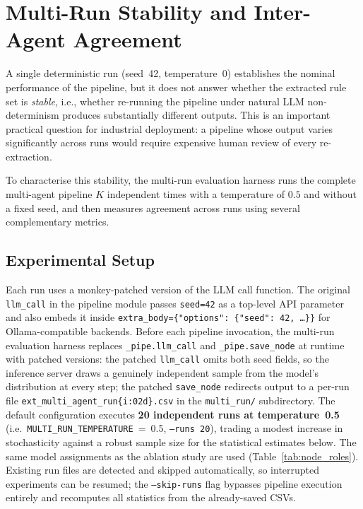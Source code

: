 ﻿\documentclass[11pt]{article}
\begin{document}
\section{Multi-Run Stability and Inter-Agent Agreement}
\label{sec:multirun}

A single deterministic run (seed~42, temperature~0) establishes the nominal
performance of the pipeline, but it does not answer whether the extracted rule
set is \emph{stable}, i.e., whether re-running the pipeline under natural
LLM non-determinism produces substantially different outputs.
This is an important practical question for industrial deployment: a pipeline
whose output varies significantly across runs would require expensive human
review of every re-extraction.

To characterise this stability, the multi-run evaluation harness runs the complete multi-agent pipeline $K$
independent times with a temperature of $0.5$ and without a fixed seed, and
then measures agreement across runs using several complementary metrics.

\subsection{Experimental Setup}
\label{sec:multirun_setup}

Each run uses a monkey-patched version of the LLM call function.
The original \texttt{llm\_call} in the pipeline module passes
\texttt{seed=42} as a top-level API parameter and also embeds it inside
\texttt{extra\_body=\{"options": \{"seed": 42, \ldots\}\}} for Ollama-compatible
backends.
Before each pipeline invocation, the multi-run evaluation harness replaces
\texttt{\_pipe.llm\_call} and \texttt{\_pipe.save\_node} at runtime with
patched versions: the patched \texttt{llm\_call} omits both seed fields,
so the inference server draws a genuinely independent sample from the model's
distribution at every step; the patched \texttt{save\_node} redirects output to
a per-run file \texttt{ext\_multi\_agent\_run\{i:02d\}.csv} in the
\texttt{multi\_run/} subdirectory.
The default configuration executes \textbf{20 independent runs at temperature~0.5}
(i.e.\ \texttt{MULTI\_RUN\_TEMPERATURE}~=~0.5, \texttt{--runs 20}), trading a
modest increase in stochasticity against a robust sample size for the statistical
estimates below.
The same model assignments as the ablation study are used
(Table~\ref{tab:node_roles}).
Existing run files are detected and skipped automatically, so interrupted
experiments can be resumed; the \texttt{--skip-runs} flag bypasses pipeline
execution entirely and recomputes all statistics from the already-saved CSVs.
\end{document}
